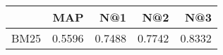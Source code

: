 \begin{tabular}{lrrrr}
\toprule
{} &     MAP &     N@1 &     N@2 &     N@3 \\
\midrule
BM25 &  0.5596 &  0.7488 &  0.7742 &  0.8332 \\
\bottomrule
\end{tabular}
